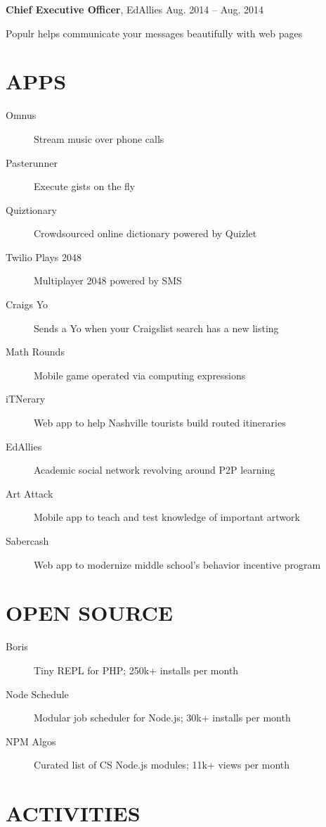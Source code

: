 \documentclass{res}
\begin{document}
{\bf Chief Executive Officer}, EdAllies \hfill Aug. 2014 -- Aug. 2014
\begin{description}
  \item Populr helps communicate your messages beautifully with web pages
\end{description}

\section{APPS}

\begin{description}
  \item[Omnus] Stream music over phone calls
  \item[Pasterunner] Execute gists on the fly
  \item[Quiztionary] Crowdsourced online dictionary powered by Quizlet
  \item[Twilio Plays 2048] Multiplayer 2048 powered by SMS
  \item[Craigs Yo] Sends a Yo when your Craigslist search has a new listing
  \item[Math Rounds] Mobile game operated via computing expressions
  \item[iTNerary] Web app to help Nashville tourists build routed itineraries
  \item[EdAllies] Academic social network revolving around P2P learning
  \item[Art Attack] Mobile app to teach and test knowledge of important artwork
  \item[Sabercash] Web app to modernize middle school's behavior incentive program
\end{description}

\section{OPEN SOURCE}

\begin{description}
  \item[Boris] Tiny REPL for PHP; 250k+ installs per month
  \item[Node Schedule] Modular job scheduler for Node.js; 30k+ installs per month
  \item[NPM Algos] Curated list of CS Node.js modules; 11k+ views per month
\end{description}

\section{ACTIVITIES}
\end{document}

